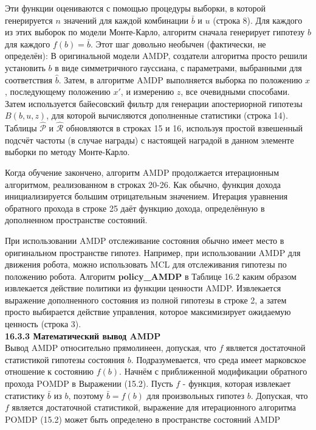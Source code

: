 \documentclass[10pt,a4paper]{article}
\begin{document}
Эти функции оцениваются с помощью процедуры выборки, в которой генерируется $n$ значений для каждой комбинации $\bar{b}$ и $u$ (строка  8).   Для каждого из этих выборок по модели Монте-Карло, алгоритм сначала генерирует гипотезу $b$ для каждого $f (b) = \bar{b}$.  Этот шаг довольно необычен (фактически, не определён): В оригинальной модели AMDP, создатели алгоритма просто решили установить $b$ в виде симметричного гауссиана, с параметрами, выбранными для соответствия $\hat{b}$.  Затем, в алгоритме AMDP выполняется выборка по положению $x$, последующему положению $x'$, и измерению $z$, все очевидными способами. Затем используется байесовский фильтр для генерации апостериорной гипотезы $B(b, u, z)$, для которой вычисляются дополненные статистики (строка 14).  Таблицы $\hat{\mathcal{P}}$ и $\hat{\mathcal{R}}$ обновляются в строках 15 и 16, используя простой взвешенный подсчёт частоты (в случае награды) с настоящей наградой в данном элементе выборки по методу Монте-Карло.

Когда обучение закончено, алгоритм AMDP продолжается итерационным алгоритмом, реализованном в строках 20-26. Как обычно, функция дохода инициализируется большим отрицательным значением. Итерация уравнения обратного прохода в строке 25 даёт функцию дохода, определённую в дополненном пространстве состояний.

При использовании AMDP отслеживание состояния обычно имеет место в оригинальном пространстве гипотез. Например, при использовании AMDP для движения робота, можно использовать MCL для отслеживания гипотезы по положению робота. Алгоритм \textbf{policy\_AMDP} в Таблице 16.2 каким образом извлекается действие политики из функции ценности AMDP. Извлекается выражение дополненного состояния из полной гипотезы в строке 2, а затем просто выбирается действие управления, которое максимизирует ожидаемую ценность (строка 3).\\

\textbf{16.3.3	Математический вывод AMDP}\\

Вывод AMDP относительно прямолинеен, допуская, что $f$ является достаточной статистикой гипотезы состояния $b$. Подразумевается, что среда имеет марковское отношение к состоянию $f(b)$. Начнём с приближенной модификации обратного прохода POMDP в Выражении (15.2). Пусть $f$ - функция, которая извлекает статистику $\bar{b}$ из $b$, поэтому $\bar{b} = f (b)$ для произвольных гипотез $b$. Допуская, что $f$ является достаточной статистикой, выражение для итерационного алгоритма POMDP (15.2) может быть определено в пространстве состояний AMDP \\
\end{document}
